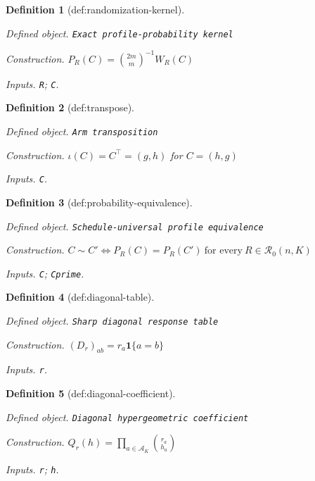 \documentclass{article}
\newtheorem{definition}{Definition}
\begin{document}
\begin{definition}[def:randomization-kernel]\label{def:randomization-kernel}
\par\smallskip\noindent\emph{Defined object.} \texttt{Exact profile-\allowbreak{}probability kernel}
\par\smallskip\noindent\emph{Construction.} \(P_R(C)=\binom{2m}{m}^{-1}W_R(C)\)
\par\smallskip\noindent\emph{Inputs.} \texttt{R}; \texttt{C}.
\end{definition}

\begin{definition}[def:transpose]\label{def:transpose}
\par\smallskip\noindent\emph{Defined object.} \texttt{Arm transposition}
\par\smallskip\noindent\emph{Construction.} \(\iota(C)=C^\top=(g,h)\) for \(C=(h,g)\)
\par\smallskip\noindent\emph{Inputs.} \texttt{C}.
\end{definition}

\begin{definition}[def:probability-equivalence]\label{def:probability-equivalence}
\par\smallskip\noindent\emph{Defined object.} \texttt{Schedule-\allowbreak{}universal profile equivalence}
\par\smallskip\noindent\emph{Construction.} \(C\sim C'\Longleftrightarrow P_R(C)=P_R(C')\ \text{for every}\ R\in\mathcal R_0(n,K)\)
\par\smallskip\noindent\emph{Inputs.} \texttt{C}; \texttt{Cprime}.
\end{definition}

\begin{definition}[def:diagonal-table]\label{def:diagonal-table}
\par\smallskip\noindent\emph{Defined object.} \texttt{Sharp diagonal response table}
\par\smallskip\noindent\emph{Construction.} \((D_r)_{ab}=r_a\mathbf 1\{a=b\}\)
\par\smallskip\noindent\emph{Inputs.} \texttt{r}.
\end{definition}

\begin{definition}[def:diagonal-coefficient]\label{def:diagonal-coefficient}
\par\smallskip\noindent\emph{Defined object.} \texttt{Diagonal hypergeometric coefficient}
\par\smallskip\noindent\emph{Construction.} \(Q_r(h)=\prod_{a\in\mathcal A_K}\binom{r_a}{h_a}\)
\par\smallskip\noindent\emph{Inputs.} \texttt{r}; \texttt{h}.
\end{definition}
\end{document}
